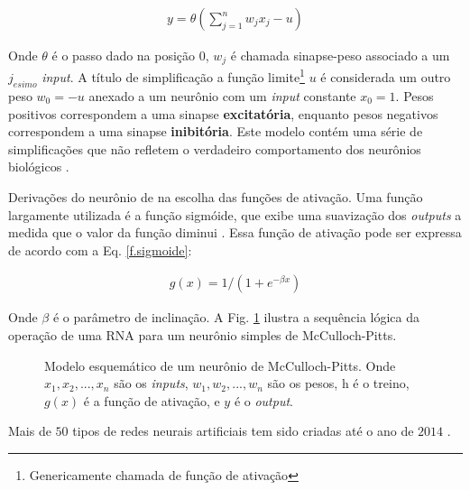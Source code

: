 \begin{eqnarray}
y=\theta \left( \sum^{n}_{j=1} w_{j} x_{j} -u \right)
\label{Eq.neuronio-McCulloch}
\end{eqnarray}

Onde $\theta$ é o passo dado na posição $0$, $w_{j}$ é chamada sinapse-peso associado a um $j_{esimo}$ \textit{input}. A título de simplificação a função limite\footnote{Genericamente chamada de função de ativação} $u$ é considerada um outro peso $w_{0}=-u$ anexado a um neurônio com um \textit{input} constante $x_{0}=1$. Pesos positivos correspondem a uma sinapse \textbf{excitatória}, enquanto pesos negativos correspondem a uma sinapse \textbf{inibitória}. Este modelo contém uma série de simplificações que não refletem o verdadeiro comportamento dos neurônios biológicos \citep{Mao1996}.  

Derivações do neurônio de \citet{McCulloch1943} na escolha das funções de ativação. Uma função largamente utilizada é a função sigmóide, que exibe uma suavização dos \textit{outputs} a medida que o valor da função diminui \citep{Mao1996,Misra2010}. Essa função de ativação pode ser expressa de acordo com a Eq. \ref{f.sigmoide}:

\begin{eqnarray}
g(x)=1/(1+e^{-\beta x})
\label{f.sigmoide}
\end{eqnarray}

Onde $\beta$ é o parâmetro de inclinação. A Fig. \ref{Esquematico de McCulloch} ilustra a sequência lógica da operação de uma RNA para um neurônio simples de McCulloch-Pitts. 
\\
\begin{figure}[H]
	\centering
	\setlength{\fboxsep}{8pt}
	\setlength{\fboxrule}{0.1pt}
	\caption{Modelo esquemático de um neurônio de McCulloch-Pitts. Onde $x_{1}, x_{2}, ..., x_{n}$ são os \textit{inputs}, $w_{1}, w_{2}, ..., w_{n}$ são os pesos, h é o treino, $g(x)$ é a função de ativação, e $y$ é o \textit{output}.}
	\label{Esquematico de McCulloch}
\end{figure}

Mais de $50$ tipos de redes neurais artificiais tem sido criadas até o ano de $2014$ \citep{Saljooghi2014}.


